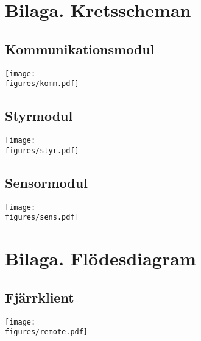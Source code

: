\documentclass[main.tex]{subfiles}
\begin{document}
\pagestyle{empty}

\begin{appendices}
    \begin{landscape}

    \section{Bilaga. Kretsscheman}
    
    \subsection{Kommunikationsmodul}
    \label{cdiag:comm}
	    \texttt{[image: \\figures/komm.pdf]}

    \subsection{Styrmodul}
    \label{cdiag:ctrl}
	    \texttt{[image: \\figures/styr.pdf]}

    \subsection{Sensormodul}
    \label{cdiag:sens}
	    \texttt{[image: \\figures/sens.pdf]}

    \section{Bilaga. Flödesdiagram}

    \subsection{Fjärrklient}
    \label{flow:remote}
	    \texttt{[image: \\figures/remote.pdf]}

    \end{landscape}
\end{appendices}
\end{document}
